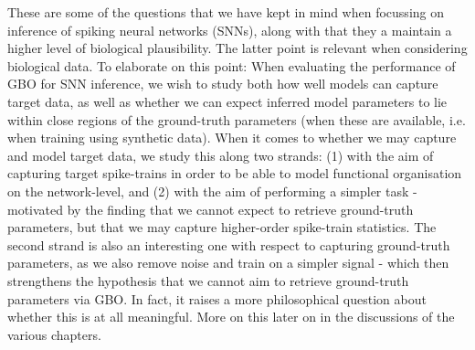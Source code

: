 \documentclass[mphil,deptreport,ianc]{infthesis} %
\begin{document}
These are some of the questions that we have kept in mind when focussing on inference of spiking neural networks (SNNs), along with that they a maintain a higher level of biological plausibility. The latter point is relevant when considering biological data.
To elaborate on this point: When evaluating the performance of GBO for SNN inference, we wish to study both how well models can capture target data, as well as whether we can expect inferred model parameters to lie within close regions of the ground-truth parameters (when these are available, i.e. when training using synthetic data).
When it comes to whether we may capture and model target data, we study this along two strands:
(1) with the aim of capturing target spike-trains in order to be able to model functional organisation on the network-level, and (2) with the aim of performing a simpler task - motivated by the finding that we cannot expect to retrieve ground-truth parameters, but that we may capture higher-order spike-train statistics.
The second strand is also an interesting one with respect to capturing ground-truth parameters, as we also remove noise and train on a simpler signal - which then strengthens the hypothesis that we cannot aim to retrieve ground-truth parameters via GBO.
In fact, it raises a more philosophical question about whether this is at all meaningful. More on this later on in the discussions of the various chapters.
\end{document}
